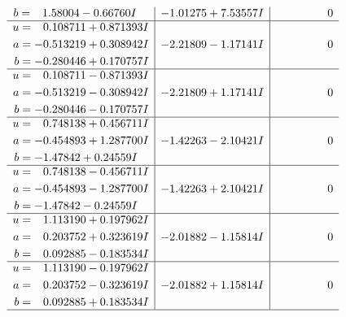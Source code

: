 \documentclass[1p]{elsarticle_modified}
\theoremstyle{definition}
\begin{document}
$$\begin{array}{c|c|c}
\begin{aligned}
b &= \phantom{-}1.58004 - 0.66760 I\end{aligned}
 & -1.01275 + 7.53557 I & \phantom{-0.000000 } 0 \\ \hline\begin{aligned}
u &= \phantom{-}0.108711 + 0.871393 I \\
a &= -0.513219 + 0.308942 I \\
b &= -0.280446 + 0.170757 I\end{aligned}
 & -2.21809 - 1.17141 I & \phantom{-0.000000 } 0 \\ \hline\begin{aligned}
u &= \phantom{-}0.108711 - 0.871393 I \\
a &= -0.513219 - 0.308942 I \\
b &= -0.280446 - 0.170757 I\end{aligned}
 & -2.21809 + 1.17141 I & \phantom{-0.000000 } 0 \\ \hline\begin{aligned}
u &= \phantom{-}0.748138 + 0.456711 I \\
a &= -0.454893 + 1.287700 I \\
b &= -1.47842 + 0.24559 I\end{aligned}
 & -1.42263 - 2.10421 I & \phantom{-0.000000 } 0 \\ \hline\begin{aligned}
u &= \phantom{-}0.748138 - 0.456711 I \\
a &= -0.454893 - 1.287700 I \\
b &= -1.47842 - 0.24559 I\end{aligned}
 & -1.42263 + 2.10421 I & \phantom{-0.000000 } 0 \\ \hline\begin{aligned}
u &= \phantom{-}1.113190 + 0.197962 I \\
a &= \phantom{-}0.203752 + 0.323619 I \\
b &= \phantom{-}0.092885 - 0.183534 I\end{aligned}
 & -2.01882 - 1.15814 I & \phantom{-0.000000 } 0 \\ \hline\begin{aligned}
u &= \phantom{-}1.113190 - 0.197962 I \\
a &= \phantom{-}0.203752 - 0.323619 I \\
b &= \phantom{-}0.092885 + 0.183534 I\end{aligned}
 & -2.01882 + 1.15814 I & \phantom{-0.000000 } 0\\
 \hline 
 \end{array}$$\newpage$$\begin{array}{c|c|c}  

\end{array}$$
\end{document}
